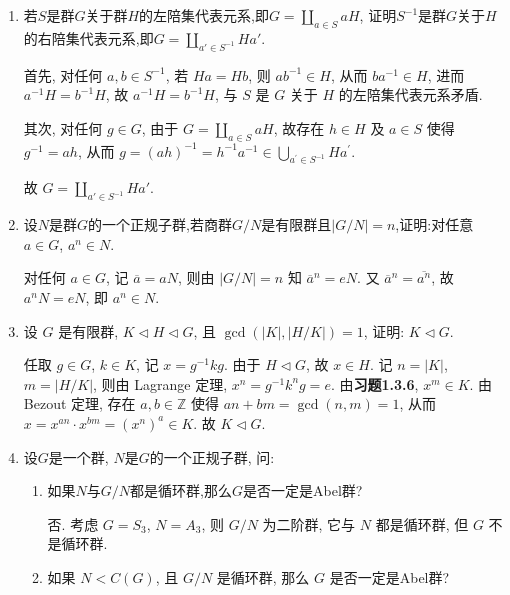 \begin{enumerate}
\item 若$S$是群$G$关于群$H$的左陪集代表元系,即$G = \coprod\limits_{a \in S} aH$,
证明$S^{-1}$是群$G$关于$H$的右陪集代表元系,即$G = \coprod\limits_{a' \in S^{-1}} Ha'$.
\begin{solution}
    首先, 对任何 $a,b\in S^{-1}$,
    若 $Ha=Hb$,
    则 $ab^{-1}\in H$,
    从而 $ba^{-1}\in H$,
    进而 $a^{-1}H=b^{-1}H$,
    故 $a^{-1}H=b^{-1}H$,
    与 $S$ 是 $G$ 关于 $H$ 的左陪集代表元系矛盾.

    其次, 对任何 $g \in G$,
    由于 $G=\coprod\limits_{a\in S} aH$,
    故存在 $h\in H$ 及 $a\in S$ 使得 $g^{-1}=ah$,
    从而 $g=\left(ah\right)^{-1}=h^{-1}a^{-1}\in \bigcup\limits_{a^\prime \in S^{-1}}Ha^\prime$.

    故 $G=\coprod\limits_{a' \in S^{-1}} Ha'$. 
\end{solution}

\item 设$N$是群$G$的一个正规子群,若商群$G / N$是有限群且$|G / N|=n$,证明:对任意$a \in G$, $a^n \in N$.
\begin{solution}
    对任何 $a \in G$,
    记 $\overline{a}=aN$,
    则由 $|G/N|=n$ 知 $\overline{a}^n=eN$.
    又 $\overline{a}^n=\overline{a^n}$,
    故 $a^nN=eN$,
    即 $a^n\in N$. 
\end{solution}

\item 设 $G$ 是有限群, $K \triangleleft H \triangleleft G$, 且 $\gcd(|K|,|H / K|)=1$, 证明: $K \triangleleft G$.
\begin{solution}
    任取 $g \in G$, $k \in K$, 记 $x = g^{-1} k g$.
    由于 $H \triangleleft G$, 故 $x \in H$.
    记 $n=|K|$, $m=|H/K|$,
    则由 Lagrange 定理, $x^n=g^{-1}k^n g=e$.
    由\textbf{习题1.3.6}, $x^m \in K$.
    由 Bezout 定理, 存在 $a,b\in\mathbb{Z}$ 使得 $an+bm=\gcd(n,m)=1$,
    从而 $x = x^{an}\cdot x^{bm} = \left( x^n \right)^a \in K$. 故 $K\triangleleft G$. 
\end{solution}

\item 设$G$是一个群, $N$是$G$的一个正规子群, 问:
\begin{enumerate}[label=(\arabic*)]
\item 如果$N$与$G/N$都是循环群,那么$G$是否一定是Abel群?
\begin{solution}
    否. 考虑 $G=S_3$, $N=A_3$,
    则 $G/N$ 为二阶群,
    它与 $N$ 都是循环群,
    但 $G$ 不是循环群. 
\end{solution}
\item 如果 $N<C(G)$, 且 $G/N$ 是循环群, 那么 $G$ 是否一定是Abel群?


\end{enumerate}
\end{enumerate}
